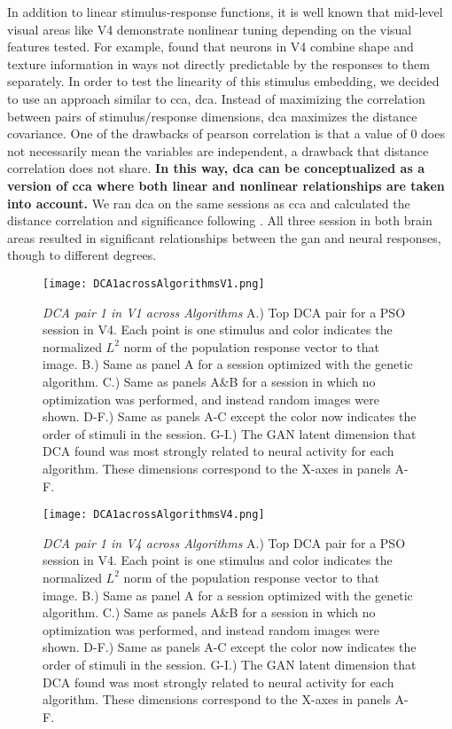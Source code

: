  In addition to linear stimulus-response functions, it is well known that mid-level visual areas like V4 demonstrate nonlinear tuning depending on the visual features tested. For example, \cite{Kim2019} found that neurons in V4 combine shape and texture information in ways not directly predictable by the responses to them separately. In order to test the linearity of this stimulus embedding, we decided to use an approach similar to \gls{cca}, \gls{dca}. Instead of maximizing the correlation between pairs of stimulus/response dimensions, \gls{dca} maximizes the distance covariance. One of the drawbacks of pearson correlation is that a value of 0 does not necessarily mean the variables are independent, a drawback that distance correlation does not share. \textbf{In this way, \gls{dca} can be conceptualized as a version of \gls{cca} where both linear and nonlinear relationships are taken into account.} We ran \gls{dca} on the same sessions as \gls{cca} and calculated the distance correlation and significance following \cite{Shen2022}. All three session in both brain areas resulted in significant relationships between the \gls{gan} and neural responses, though to different degrees.
 
\begin{figure}
	\centering
	\texttt{[image: DCA1acrossAlgorithmsV1.png]}
	{\caption{{\it DCA pair 1 in V1 across Algorithms} A.) Top DCA pair for a PSO session in V4. Each point is one stimulus and color indicates the normalized $L^2$ norm of the population response vector to that image. B.) Same as panel A for a session optimized with the genetic algorithm. C.) Same as panels A\&B for a session in which no optimization was performed, and instead random images were shown. D-F.) Same as panels A-C except the color now indicates the order of stimuli in the session. G-I.) The GAN latent dimension that DCA found was most strongly related to neural activity for each algorithm. These dimensions correspond to the X-axes in panels A-F.}
	\label{fig:dca1V1}}
\end{figure}


\begin{figure}
	\centering
	\texttt{[image: DCA1acrossAlgorithmsV4.png]}
	{\caption{{\it DCA pair 1 in V4 across Algorithms} A.) Top DCA pair for a PSO session in V4. Each point is one stimulus and color indicates the normalized $L^2$ norm of the population response vector to that image. B.) Same as panel A for a session optimized with the genetic algorithm. C.) Same as panels A\&B for a session in which no optimization was performed, and instead random images were shown. D-F.) Same as panels A-C except the color now indicates the order of stimuli in the session. G-I.) The GAN latent dimension that DCA found was most strongly related to neural activity for each algorithm. These dimensions correspond to the X-axes in panels A-F.}
	\label{fig:dca1V4}}
\end{figure}

